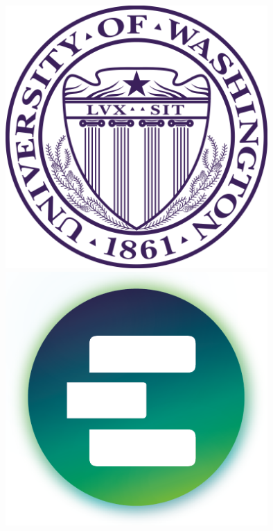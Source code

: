 \documentclass[a0, landscape]{a0poster}
\begin{document}
\begin{minipage}[b]{0.19\linewidth}
\includegraphics[width=10cm]{UWlogo.png}
\includegraphics[width=10cm]{small_e_logo_cropped.png}
\end{minipage}

\vspace{0.5cm} %

\end{document}
